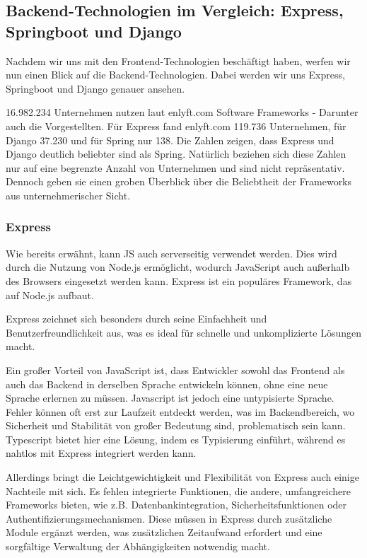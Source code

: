 \documentclass[biblatex]{lni}
\begin{document}
\subsection{Backend-Technologien im Vergleich: Express, Springboot und Django}

Nachdem wir uns mit den Frontend-Technologien beschäftigt haben, werfen wir nun einen Blick auf die Backend-Technologien.
Dabei werden wir uns Express, Springboot und Django genauer ansehen.

16.982.234 Unternehmen nutzen laut enlyft.com Software Frameworks -
Darunter auch die Vorgestellten.
Für Express fand enlyft.com 119.736 Unternehmen, für Django 37.230 und für Spring nur 138.
Die Zahlen zeigen, dass Express und Django deutlich beliebter sind als Spring.
Natürlich beziehen sich diese Zahlen nur auf eine begrenzte Anzahl von Unternehmen und sind nicht repräsentativ.
Dennoch geben sie einen groben Überblick über die Beliebtheit der Frameworks aus unternehmerischer Sicht.

\subsubsection{Express}

Wie bereits erwähnt, kann \ac{JS} auch serverseitig verwendet werden.
Dies wird durch die Nutzung von Node.js ermöglicht, wodurch JavaScript auch außerhalb des Browsers eingesetzt werden kann.
Express ist ein populäres Framework, das auf Node.js aufbaut.

Express zeichnet sich besonders durch seine Einfachheit und Benutzerfreundlichkeit aus,
was es ideal für schnelle und unkomplizierte Lösungen macht.

Ein großer Vorteil von JavaScript ist,
dass Entwickler sowohl das Frontend als auch das Backend in derselben Sprache entwickeln können,
ohne eine neue Sprache erlernen zu müssen.
Javascript ist jedoch eine untypisierte Sprache.
Fehler können oft erst zur Laufzeit entdeckt werden, was im Backendbereich,
wo Sicherheit und Stabilität von großer Bedeutung sind, problematisch sein kann.
Typescript bietet hier eine Lösung, indem es Typisierung einführt, während es nahtlos mit Express integriert werden kann.

Allerdings bringt die Leichtgewichtigkeit und Flexibilität von Express auch einige Nachteile mit sich.
Es fehlen integrierte Funktionen, die andere, umfangreichere Frameworks bieten,
wie z.B. Datenbankintegration, Sicherheitsfunktionen oder Authentifizierungsmechanismen.
Diese müssen in Express durch zusätzliche Module ergänzt werden,
was zusätzlichen Zeitaufwand erfordert und eine sorgfältige Verwaltung der Abhängigkeiten notwendig macht.
\end{document}

